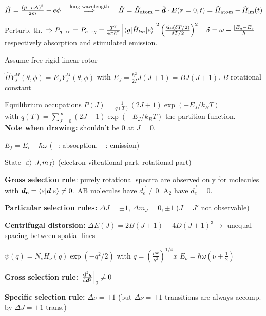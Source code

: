 \begin{squishlist}
    \item $\hat{H} = \frac{(\hat{p} + e\bm{A})^2}{2m} - e\phi \quad \overset{\text{long wavelength}}{\Longrightarrow} \quad \hat{H} = \hat{H}_{\text{atom}} - {\hat{\bm{d}}\cdot \bm{E}(\bm{r}=0,t)} = \hat{H}_{\text{atom}} - \hat{H}_{\text{lm}}(t)$
    \item Perturb. th. $\Rightarrow P_{g\rightarrow e} = P_{e \rightarrow g} = \frac{T^2}{4 \pi \hbar^2}\left| \braket{g|\hat{H}_{lm}|e}\right|^2 \left(\frac{\sin (\delta T / 2)}{\delta T / 2}\right)^2 \quad \delta = \omega - \frac{|E_g - E_e}{\hbar}$  \\
    respectively absorption and stimulated emission.
\end{squishlist}

\begin{squishlist}
    \item Assume free rigid linear rotor
    \item $\hat{H} Y_J^M(\theta, \phi) = E_J Y_J^M(\theta, \phi)$ with $E_J = \frac{\hbar^2}{2I} J (J+1) = B J(J+1)$. $B$ rotational constant
    \item Equilibrium occupations $P(J) = \frac{1}{q(T)} (2J+1) \exp(-E_J / k_B T)$ \\
    with $q(T) = \sum_{J=0}^{\infty} (2J+1) \exp(-E_J / k_B T)$ the partition function. \\ 
    \textbf{Note when drawing:} shouldn't be $0$ at $J=0$.

    \item $E_f = E_i \pm \hbar \omega$ ($+$: absorption, $-$: emission)
    \item State $\ket{\varepsilon} \ket{J, m_J}$ (electron vibrational part, rotational part)
    \item \textbf{Gross selection rule}: purely rotational spectra are observed only for molecules with $\bm{d_e} = \braket{\varepsilon|\bm{d}|\varepsilon} \neq 0$. AB molecules have $\vec{d_e} \neq 0$. A$_2$ have $\vec{d_e} = 0$.
    \item \textbf{Particular selection rules:} $\Delta J = \pm 1$, $\Delta m_J = 0, \pm 1$ ($J=J'$ not observable)
    \item \textbf{Centrifugal distorsion:} $\Delta E(J) = 2B (J+1) - 4D(J+1)^3 \longrightarrow$ unequal spacing between spatial lines
\end{squishlist}

\begin{squishlist}
    \item $\psi(q) = N_{\nu} H_{\nu}(q) \exp(-q^2/2)$ with $q = \left(\frac{\mu k}{\hbar^2}\right)^{1/4}x$ \squishsep $E_{\nu} = \hbar \omega (\nu + \frac{1}{2})$
    \item \textbf{Gross selection rule:} $\left.\frac{\textrm{d}^2 q}{\textrm{d} \bm{d}^2}\right|_0 \neq 0$
    \item \textbf{Specific selection rule:} $\Delta \nu = \pm 1$ (but $\Delta \nu = \pm 1$ transitions are always accomp. by $\Delta J = \pm 1$ trans.)
\end{squishlist}

